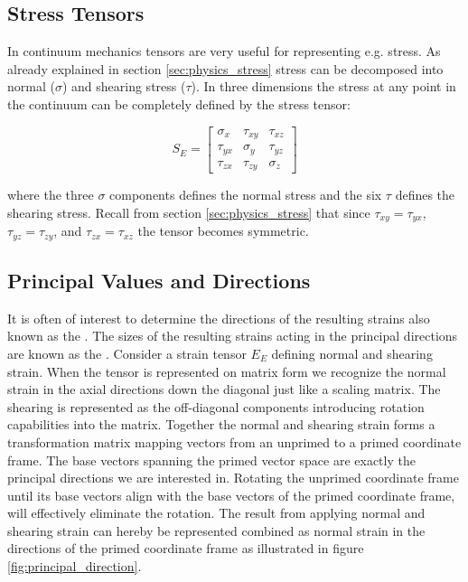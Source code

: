 \subsection{Stress Tensors}
In continuum mechanics tensors are very useful for representing
e.g. stress. As already explained in section \vref{sec:physics_stress}
stress can be decomposed into normal ($\sigma$) and 
shearing stress ($\tau$). In three dimensions the stress at any point
in the continuum can be completely defined by the stress tensor:

\begin{equation}
\label{eq:stress_tensor}
  S_E = 
  \left[{\begin{matrix} 
        \sigma_x & \tau_{xy} & \tau_{xz} \\ 
        \tau_{yx} & \sigma_y & \tau_{yz} \\ 
        \tau_{zx} & \tau_{zy} & \sigma_z 
      \end{matrix}}\right]
\end{equation}

where the three $\sigma$ components defines the normal stress and the
six $\tau$ defines the shearing stress. Recall from section
\vref{sec:physics_stress} that
since $\tau_{xy} = \tau_{yx}$, $\tau_{yz} = \tau_{zy}$, and $\tau_{zx} =
\tau_{xz}$ the tensor becomes symmetric.


\subsection{Principal Values and Directions}
\label{sec:principal_values_and_directions}
It is often of interest to determine the directions of the resulting 
strains also known as the . The sizes of the resulting
strains acting in the principal directions are known as the
. 
Consider a
strain tensor $E_E$ defining normal and shearing strain. When the
tensor is represented on matrix form we recognize the normal strain
in the axial directions down the diagonal just like a scaling matrix. The shearing is
represented as the off-diagonal components introducing rotation
capabilities into the matrix. Together the normal and shearing strain
forms a transformation matrix mapping vectors from an unprimed to a
primed coordinate frame. The base vectors spanning the primed vector space are
exactly the principal directions we are interested in. Rotating the
unprimed coordinate frame until its base vectors align with the base vectors of the
primed coordinate frame, will effectively eliminate the rotation. 
The result from applying normal and shearing strain can hereby be
represented combined as normal strain in the directions of the primed
coordinate frame as illustrated in figure \vref{fig:principal_direction}.

